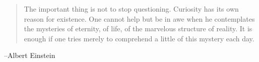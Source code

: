 \documentclass[letterpaper]{exam}
\begin{document}
  \else
    \vspace{10 cm}
    \begin{quote}
      \begin{em}
        The important thing is not to stop questioning. Curiosity has its own reason
        for existence. One cannot help but be in awe when he contemplates the mysteries
        of eternity, of life, of the marvelous structure of reality. It is enough if
        one tries merely to comprehend a little of this mystery each day.
      \end{em}
    \end{quote}
    \hspace{2 cm} --Albert Einstein
  \fi
\end{document}
